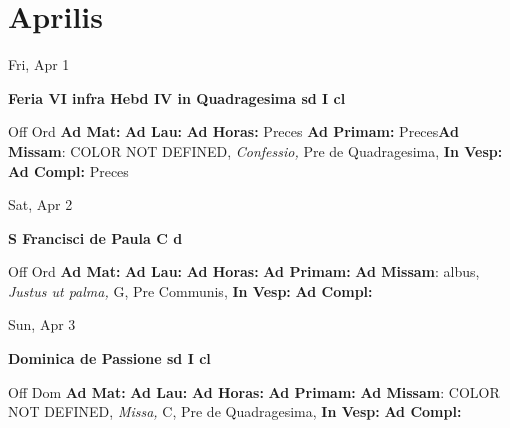 \documentclass[10pt]{book}
\begin{document}
    \chapter*{Aprilis}
                    
\begin{center}
\begin{minipage}{3.5in}
\vspace{2em}
\begin{center}Fri, Apr 1
\end{center}
\textbf{ \large Feria VI infra Hebd IV in Quadragesima 
\textnormal{\normalsize sd I cl}}

\begin{justify}Off Ord
\textbf{Ad Mat: }
\textbf{Ad Lau: }
\textbf{Ad Horas: }Preces
\textbf{Ad Primam: }Preces\textbf{Ad Missam}: COLOR NOT DEFINED, \textit{Confessio,} Pre de Quadragesima, 
\textbf{In Vesp: }
\textbf{Ad Compl: }Preces
\end{justify}
\end{minipage}
\end{center}

\begin{center}
\begin{minipage}{3.5in}
\vspace{2em}
\begin{center}Sat, Apr 2
\end{center}
\textbf{ \large S Francisci de Paula C
\textnormal{\normalsize d}}

\begin{justify}Off Ord
\textbf{Ad Mat: }
\textbf{Ad Lau: }
\textbf{Ad Horas: }
\textbf{Ad Primam: }\textbf{Ad Missam}: albus, \textit{Justus ut palma,} G, Pre Communis, 
\textbf{In Vesp: }
\textbf{Ad Compl: }
\end{justify}
\end{minipage}
\end{center}

\begin{center}
\begin{minipage}{3.5in}
\vspace{2em}
\begin{center}Sun, Apr 3
\end{center}
\textbf{ \large Dominica de Passione
\textnormal{\normalsize sd I cl}}

\begin{justify}Off Dom
\textbf{Ad Mat: }
\textbf{Ad Lau: }
\textbf{Ad Horas: }
\textbf{Ad Primam: }\textbf{Ad Missam}: COLOR NOT DEFINED, \textit{Missa,} C, Pre de Quadragesima, 
\textbf{In Vesp: }
\textbf{Ad Compl: }
\end{justify}
\end{minipage}
\end{center}
\end{document}

